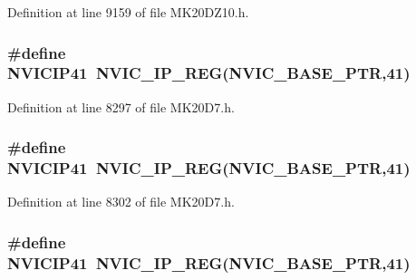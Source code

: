 Definition at line 9159 of file M\+K20\+D\+Z10.\+h.

\subsubsection[{\texorpdfstring{N\+V\+I\+C\+I\+P41}{NVICIP41}}]{\setlength{\rightskip}{0pt plus 5cm}\#define N\+V\+I\+C\+I\+P41~{\bf N\+V\+I\+C\+\_\+\+I\+P\+\_\+\+R\+EG}({\bf N\+V\+I\+C\+\_\+\+B\+A\+S\+E\+\_\+\+P\+TR},41)}\hypertarget{group___n_v_i_c___register___accessor___macros_ga979091f5e20e1688dc5836d38cff4691}{}\label{group___n_v_i_c___register___accessor___macros_ga979091f5e20e1688dc5836d38cff4691}


Definition at line 8297 of file M\+K20\+D7.\+h.

\subsubsection[{\texorpdfstring{N\+V\+I\+C\+I\+P41}{NVICIP41}}]{\setlength{\rightskip}{0pt plus 5cm}\#define N\+V\+I\+C\+I\+P41~{\bf N\+V\+I\+C\+\_\+\+I\+P\+\_\+\+R\+EG}({\bf N\+V\+I\+C\+\_\+\+B\+A\+S\+E\+\_\+\+P\+TR},41)}\hypertarget{group___n_v_i_c___register___accessor___macros_ga979091f5e20e1688dc5836d38cff4691}{}\label{group___n_v_i_c___register___accessor___macros_ga979091f5e20e1688dc5836d38cff4691}


Definition at line 8302 of file M\+K20\+D7.\+h.

\subsubsection[{\texorpdfstring{N\+V\+I\+C\+I\+P41}{NVICIP41}}]{\setlength{\rightskip}{0pt plus 5cm}\#define N\+V\+I\+C\+I\+P41~{\bf N\+V\+I\+C\+\_\+\+I\+P\+\_\+\+R\+EG}({\bf N\+V\+I\+C\+\_\+\+B\+A\+S\+E\+\_\+\+P\+TR},41)}\hypertarget{group___n_v_i_c___register___accessor___macros_ga979091f5e20e1688dc5836d38cff4691}{}\label{group___n_v_i_c___register___accessor___macros_ga979091f5e20e1688dc5836d38cff4691}



